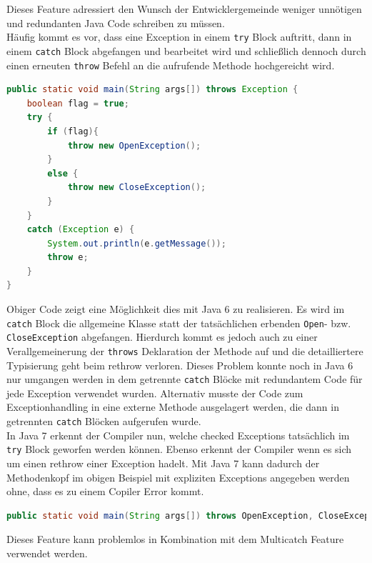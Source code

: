 \documentclass[times, 10pt,twocolumn]{article}
\begin{document}
Dieses Feature adressiert den Wunsch der Entwicklergemeinde weniger unnötigen und redundanten Java Code schreiben zu müssen.\cite{sbJ7exeptions}\\

Häufig kommt es vor, dass eine Exception in einem \texttt{try} Block auftritt, dann in einem \texttt{catch} Block abgefangen und bearbeitet wird und schließlich dennoch durch einen erneuten \texttt{throw} Befehl an die aufrufende Methode hochgereicht wird.

\begin{lstlisting}[language=java,breaklines=true]
public static void main(String args[]) throws Exception {
    boolean flag = true;
    try {
        if (flag){
            throw new OpenException();
        }
        else {
            throw new CloseException();
        }
    }
    catch (Exception e) {
        System.out.println(e.getMessage());
        throw e;
    }
}
\end{lstlisting}

Obiger Code\cite{sbJ7exeptions} zeigt eine Möglichkeit dies mit Java 6 zu realisieren. Es wird im \texttt{catch} Block die allgemeine  Klasse statt der tatsächlichen erbenden \texttt{Open}- bzw. \texttt{CloseException} abgefangen. Hierdurch kommt es jedoch auch zu einer Verallgemeinerung der \texttt{throws} Deklaration der Methode auf  und die detailliertere Typisierung geht beim rethrow verloren. Dieses Problem konnte noch in Java 6 nur umgangen werden in dem getrennte \texttt{catch} Blöcke mit redundantem Code für jede Exception verwendet wurden. Alternativ musste der Code zum Exceptionhandling in eine externe Methode ausgelagert werden, die dann in getrennten \texttt{catch} Blöcken aufgerufen wurde.\cite{scjp6}\\

In Java 7 erkennt der Compiler nun, welche checked Exceptions tatsächlich im \texttt{try} Block geworfen werden können. Ebenso erkennt der Compiler wenn es sich um einen rethrow einer Exception hadelt. Mit Java 7 kann dadurch der Methodenkopf im obigen Beispiel mit expliziten Exceptions angegeben werden ohne, dass es zu einem Copiler Error kommt\cite{sbJ7exeptions}.

\begin{lstlisting}[language=java,breaklines=true]
public static void main(String args[]) throws OpenException, CloseException
\end{lstlisting}

Dieses Feature kann problemlos in Kombination mit dem Multicatch Feature verwendet werden.
\end{document}
